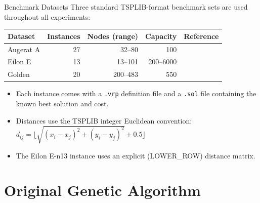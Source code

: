\documentclass[aspectratio=169]{beamer}
\begin{document}
\begin{frame}{Benchmark Datasets}
  Three standard TSPLIB-format benchmark sets are used throughout all
  experiments:
  \vspace{4pt}
  \begin{center}
  \begin{tabular}{lrrrl}
    \toprule
    Dataset & Instances & Nodes (range) & Capacity & Reference \\
    \midrule
    Augerat A  & 27 & 32--80   & 100       & \cite{augerat1995computational} \\
    Eilon E    & 13 & 13--101  & 200--6000 & \cite{christofides1979set}      \\
    Golden     & 20 & 200--483 & 550       & \cite{golden1998impact}         \\
    \bottomrule
  \end{tabular}
  \end{center}
  \vspace{4pt}
  \begin{itemize}
    \item Each instance comes with a \texttt{.vrp} definition file and
          a \texttt{.sol} file containing the known best solution and cost.
    \item Distances use the TSPLIB integer Euclidean convention:
          $d_{ij} = \lfloor \sqrt{(x_i-x_j)^2 + (y_i-y_j)^2} + 0.5 \rfloor$
    \item The Eilon E-n13 instance uses an explicit (LOWER\_ROW) distance matrix.
  \end{itemize}
\end{frame}

\section{Original Genetic Algorithm}
\end{document}
